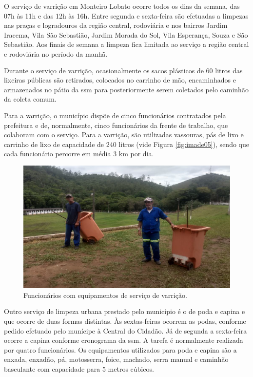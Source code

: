 O serviço de varrição em Monteiro Lobato ocorre todos os dias da semana, das 07h às 11h e das 12h às 16h. Entre segunda e sexta-feira são efetuadas a limpezas nas praças e logradouros da região central, rodoviária e nos bairros Jardim Iracema, Vila São Sebastião, Jardim Morada do Sol, Vila Esperança, Souza e São Sebastião. Aos finais de semana a limpeza fica limitada ao serviço a região central e rodoviária no período da manhã.

Durante o serviço de varrição, ocasionalmente os sacos plásticos de 60 litros das lixeiras públicas são retirados, colocados no carrinho de mão, encaminhados e armazenados no pátio da \gls{ssm} para posteriormente serem coletados pelo caminhão da coleta comum.


Para a varrição, o município dispõe de cinco funcionários contratados pela prefeitura e de, normalmente, cinco funcionários da frente de trabalho, que colaboram com o serviço. Para a varrição, são utilizadas vassouras, pás de lixo e carrinho de lixo de capacidade de 240 litros (vide Figura \ref{fig:imade05}), sendo que cada funcionário percorre em média 3 km por dia.

\begin{figure}
	\centering
	\includegraphics[width=0.7\linewidth]{produtos/prodtres/image051}
	\caption{Funcionários com equipamentos de serviço de varrição.}
	\label{fig:image051}
\end{figure}

Outro serviço de limpeza urbana prestado pelo município é o de poda e capina e que ocorre de duas formas distintas. Às sextas-feiras ocorrem as podas, conforme pedido efetuado pelo munícipe à Central do Cidadão. Já de segunda a sexta-feira ocorre a capina conforme cronograma da \gls{ssm}. A tarefa é normalmente realizada por quatro funcionários. Os equipamentos utilizados para poda e capina são a enxada, enxadão, pá, motosserra, foice, machado, serra manual e caminhão basculante com capacidade para 5 metros cúbicos.

